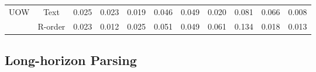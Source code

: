 \documentclass[11pt, a4paper, logo, copyright, nonumbering]{deepseek}
\begin{document}
\begin{CJK*}{UTF8}{gbsn}
\begin{table}[ht]
{\begin{tabular}{l|c|ccccccccc}
                                \midrule
                 \multirow{2}{*}{UOW}  &Text & 0.025 & 0.023 & 0.019 & 0.046 & 0.049 & 0.020 & 0.081 & 0.066 & 0.008  \\
                         &R-order & 0.023 & 0.012 & 0.025 & 0.051 & 0.049 & 0.061 & 0.134 & 0.018 & 0.013   \\
                
    \bottomrule
    \end{tabular}}

    \label{table-3}
	
\end{table}



\begin{table}[!t]\small
    \centering

    \caption{Performance of long-horizon OCR. We test the distinct-n and edit distance under different page numbers. Distinct-n is the higher the better.}
    \setlength{\abovecaptionskip}{0.5cm}


	\label{table4}
    \end{table}


\subsection{Long-horizon Parsing}


\end{CJK*}
\end{document}
